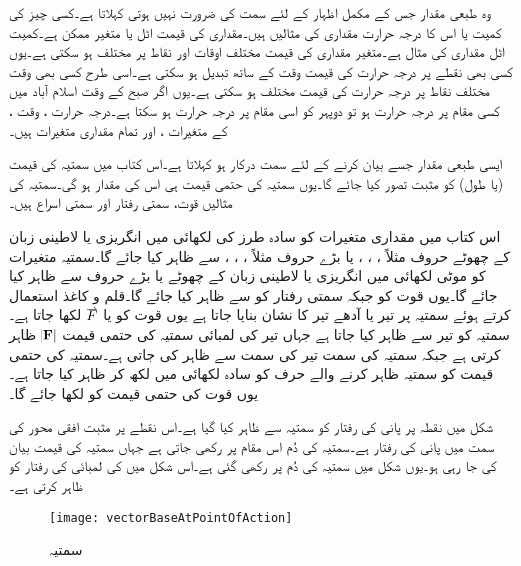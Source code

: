 وہ طبعی مقدار جس کے مکمل اظہار کے لئے سمت کی ضرورت نہیں ہوتی  کہلاتا ہے۔کسی چیز کی کمیت  یا اس کا درجہ حرارت  مقداری کی مثالیں ہیں۔مقداری کی قیمت اٹل یا متغیر ممکن ہے۔کمیت اٹل مقداری کی مثال ہے۔متغیر مقداری کی قیمت مختلف اوقات اور نقاط پر مختلف ہو سکتی ہے۔یوں کسی بھی نقطے پر درجہ حرارت کی قیمت وقت  کے ساتھ تبدیل ہو سکتی ہے۔اسی طرح کسی بھی وقت مختلف نقاط پر درجہ حرارت کی قیمت مختلف ہو سکتی ہے۔یوں اگر صبح  کے وقت اسلام آباد میں کسی مقام پر درجہ حرارت  ہو تو دوپہر کو اسی مقام پر درجہ حرارت  ہو سکتا ہے۔درجہ حرارت ، وقت ،   کے متغیرات  ،  اور  تمام مقداری متغیرات ہیں۔

ایسی طبعی مقدار جسے بیان کرنے کے لئے سمت درکار ہو  کہلاتا ہے۔اس کتاب میں سمتیہ کی قیمت (یا طول) کو مثبت تصور کیا جائے گا۔یوں سمتیہ کی حتمی قیمت ہی اس کی مقدار ہو گی۔سمتیہ کی مثالیں قوت، سمتی رفتار اور سمتی اسراع  ہیں۔

اس کتاب میں مقداری متغیرات کو سادہ طرز کی لکھائی میں انگریزی یا لاطینی زبان کے  چھوٹے حروف مثلاً ، ، ، 
  یا بڑے حروف مثلاً ، ، ،   سے ظاہر کیا جائے گا۔سمتیہ متغیرات کو موٹی لکھائی میں انگریزی یا لاطینی زبان کے  چھوٹے  یا بڑے حروف  سے ظاہر کیا جائے گا۔یوں قوت  کو  جبکہ سمتی رفتار کو  سے ظاہر کیا جائے گا۔قلم و کاغذ استعمال کرتے ہوئے سمتیہ پر تیر  یا آدھے تیر کا نشان بنایا جاتا ہے یوں قوت کو  یا  
$\overset{\rightharpoonup}{\rule{0pt}{.9ex}\smash{F}}$
لکھا جاتا ہے۔سمتیہ کو تیر سے ظاہر کیا جاتا ہے جہاں تیر کی لمبائی سمتیہ کی حتمی قیمت $\abs{\bf{F}}$  ظاہر کرتی ہے جبکہ سمتیہ کی سمت تیر کی سمت  سے ظاہر کی جاتی ہے۔سمتیہ کی حتمی قیمت کو سمتیہ ظاہر کرنے والے حرف کو سادہ لکھائی میں لکھ کر ظاہر کیا جاتا ہے۔یوں قوت   کی حتمی قیمت  کو  لکھا جائے گا۔ 

شکل  میں نقطہ  پر پانی کی رفتار کو سمتیہ  سے ظاہر کیا گیا ہے۔اس نقطے پر مثبت افقی محور کی سمت میں پانی کی رفتار  ہے۔سمتیہ کی دُم اس مقام پر رکھی جاتی ہے جہاں سمتیہ کی قیمت بیان کی جا رہی ہو۔یوں شکل میں سمتیہ کی دُم   پر رکھی گئی ہے۔اس شکل میں  کی لمبائی  کی رفتار کو ظاہر کرتی ہے۔
\begin{figure}
\centering
\texttt{[image: vectorBaseAtPointOfAction]}
\caption{سمتیہ}
\label{شکل_سمتیہ_دم_پر_عمل_درآمد_ہوتی_ہے}
\end{figure}

